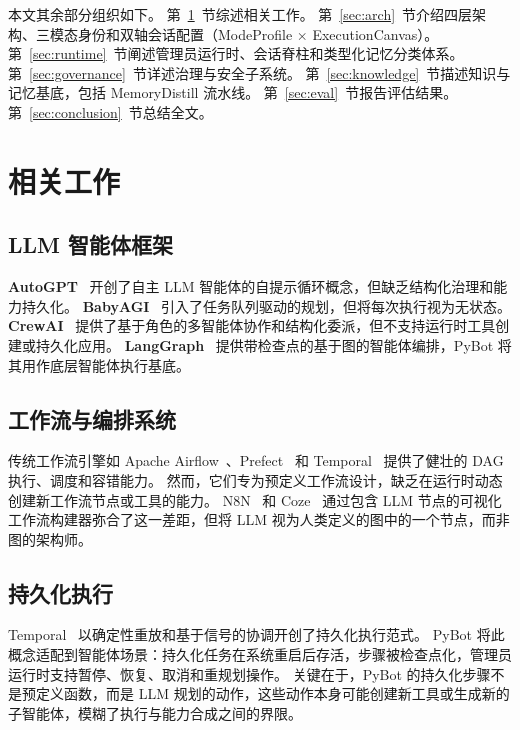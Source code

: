 \documentclass[11pt,a4paper]{article}
\begin{document}
本文其余部分组织如下。
第~\ref{sec:related}~节综述相关工作。
第~\ref{sec:arch}~节介绍四层架构、三模态身份和双轴会话配置（ModeProfile $\times$ ExecutionCanvas）。
第~\ref{sec:runtime}~节阐述管理员运行时、会话脊柱和类型化记忆分类体系。
第~\ref{sec:governance}~节详述治理与安全子系统。
第~\ref{sec:knowledge}~节描述知识与记忆基底，包括 MemoryDistill 流水线。
第~\ref{sec:eval}~节报告评估结果。
第~\ref{sec:conclusion}~节总结全文。


\section{相关工作}
\label{sec:related}

\subsection{LLM 智能体框架}

\textbf{AutoGPT}~\cite{autogpt2023} 开创了自主 LLM 智能体的自提示循环概念，但缺乏结构化治理和能力持久化。
\textbf{BabyAGI}~\cite{babyagi2023} 引入了任务队列驱动的规划，但将每次执行视为无状态。
\textbf{CrewAI}~\cite{crewai2024} 提供了基于角色的多智能体协作和结构化委派，但不支持运行时工具创建或持久化应用。
\textbf{LangGraph}~\cite{langgraph2024} 提供带检查点的基于图的智能体编排，PyBot 将其用作底层智能体执行基底。

\subsection{工作流与编排系统}

传统工作流引擎如 Apache Airflow~\cite{airflow2015}、Prefect~\cite{prefect2024} 和 Temporal~\cite{temporal2023} 提供了健壮的 DAG 执行、调度和容错能力。
然而，它们专为预定义工作流设计，缺乏在运行时动态创建新工作流节点或工具的能力。
N8N~\cite{n8n2024} 和 Coze~\cite{coze2024} 通过包含 LLM 节点的可视化工作流构建器弥合了这一差距，但将 LLM 视为人类定义的图中的一个节点，而非图的架构师。

\subsection{持久化执行}

Temporal~\cite{temporal2023} 以确定性重放和基于信号的协调开创了持久化执行范式。
PyBot 将此概念适配到智能体场景：持久化任务在系统重启后存活，步骤被检查点化，管理员运行时支持暂停、恢复、取消和重规划操作。
关键在于，PyBot 的持久化步骤不是预定义函数，而是 LLM 规划的动作，这些动作本身可能创建新工具或生成新的子智能体，模糊了执行与能力合成之间的界限。
\end{document}
